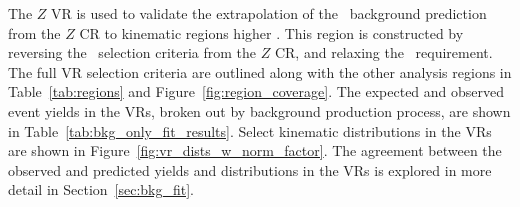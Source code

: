 The $Z$ VR is used to validate the extrapolation of the \ZGAMMAJETS\ background
prediction from the $Z$ CR to kinematic regions higher \HT.
This region is constructed by reversing the \HT\ selection criteria from the
$Z$ CR, and relaxing the \METSIG\ requirement.
The full VR selection criteria are outlined along with the other analysis
regions in Table~\ref{tab:regions} and Figure~\ref{fig:region_coverage}.
The expected and observed event yields in the VRs, broken out by background
production process, are shown in Table~\ref{tab:bkg_only_fit_results}.
Select kinematic distributions in the VRs are shown in
Figure~\ref{fig:vr_dists_w_norm_factor}.
The agreement between the observed and predicted yields and distributions in the
VRs is explored in more detail in Section~\ref{sec:bkg_fit}.

